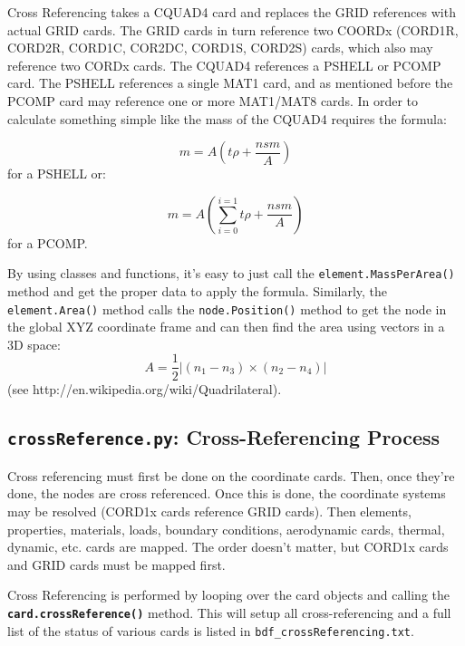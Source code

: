      Cross Referencing takes a CQUAD4 card and replaces the GRID references with actual GRID cards.  The GRID cards in turn reference two COORDx (CORD1R, CORD2R, CORD1C, COR2DC, CORD1S, CORD2S) cards, which also may reference two CORDx cards.  The CQUAD4 references a PSHELL or PCOMP card.  The PSHELL references a single MAT1 card, and as mentioned before the PCOMP card may reference one or more MAT1/MAT8 cards.  In order to calculate something simple like the mass of the CQUAD4 requires the formula:
     
     {\begin{equation} m=A \left( t\rho + \frac{nsm}{A} \right) \end{equation} } for a PSHELL or:

     {\begin{equation} m=A \left( \sum_{i=0}^{i=1}{t\rho} + \frac{nsm}{A} \right)  \end{equation} } for a PCOMP.

     By using classes and functions, it's easy to just call the {\tt element.MassPerArea()} method and get the proper data to apply the formula.  Similarly, the {\tt element.Area()} method calls the {\tt node.Position()} method to get the node in the global XYZ coordinate frame and can then find the area using vectors in a 3D space:
     {\begin{equation} A=\frac{1}{2} | (n_1-n_3) \times (n_2-n_4) | \end{equation} }
     (see http://en.wikipedia.org/wiki/Quadrilateral).
 
 
 \subsection{{\tt crossReference.py}: Cross-Referencing Process}
     Cross referencing must first be done on the coordinate cards.  Then, once they're done, the nodes are cross referenced.  Once this is done, the coordinate systems may be resolved (CORD1x cards reference GRID cards).  Then elements, properties, materials, loads, boundary conditions, aerodynamic cards, thermal, dynamic, etc. cards are mapped.  The order doesn't matter, but CORD1x cards and GRID cards must be mapped first.
     
     Cross Referencing is performed by looping over the card objects and calling the {\bf \tt card.crossReference()} method.  This will setup all cross-referencing and a full list of the status of various cards is listed in {\tt bdf\_crossReferencing.txt}.

